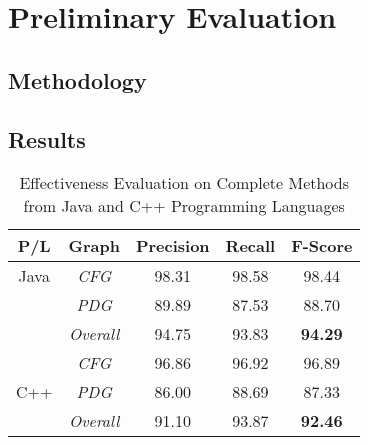 \section{Preliminary Evaluation}

\subsection{Methodology}

\subsection{Results}

\begin{table}[H]
  \centering
  \small
  \caption{Effectiveness Evaluation on Complete Methods from Java and C++ Programming Languages}
\begin{tabular}{c|c|c|c|c}
\hline
\textbf{P/L}         & \textbf{Graph}   & \textbf{Precision} & \textbf{Recall} & \textbf{F-Score} \\ \hline
Java                 & \textit{CFG}     & 98.31              & 98.58           & 98.44            \\
                     & \textit{PDG}     & 89.89              & 87.53           & 88.70            \\
                     & \textit{Overall} & 94.75            & 93.83           & \textbf{94.29}   \\
\hline
\multirow{3}{*}{C++} & \textit{CFG}     & 96.86            & 96.92         & 96.89           \\
                     & \textit{PDG}     & 86.00            & 88.69         & 87.33           \\
                     & \textit{Overall} & 91.10            & 93.87         & \textbf{92.46}  \\
\hline
\end{tabular}
\label{tab:intrinsic-java}
\end{table}